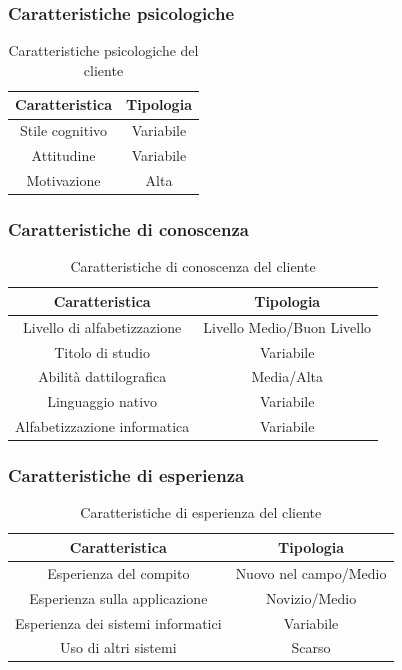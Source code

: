 \subsubsection{Caratteristiche psicologiche}
\begin{table}[h]
	\centering
	\begin{tabular}{|c|c|}
		\hline
		\textbf{Caratteristica} & \textbf{Tipologia} \\
		\hline
		Stile cognitivo & Variabile\\
		\hline
		Attitudine & Variabile \\
		\hline
		Motivazione & Alta \\
		\hline
	\end{tabular}
	\caption{Caratteristiche psicologiche del cliente}
\end{table}

\subsubsection{Caratteristiche di conoscenza}
\begin{table}[h]
	\centering
	\begin{tabular}{|c|c|}
		\hline
		\textbf{Caratteristica} & \textbf{Tipologia} \\
		\hline
		Livello di alfabetizzazione & Livello Medio/Buon Livello \\
		\hline
		Titolo di studio & Variabile \\
		\hline
		Abilità dattilografica & Media/Alta \\
		\hline
		Linguaggio nativo & Variabile \\
		\hline
		Alfabetizzazione informatica & Variabile \\
		\hline
	\end{tabular}
	\caption{Caratteristiche di conoscenza del cliente}
\end{table}

\subsubsection{Caratteristiche di esperienza}
\begin{table}[h]
	\centering
	\begin{tabular}{|c|c|}
		\hline
		\textbf{Caratteristica} & \textbf{Tipologia} \\
		\hline
		Esperienza del compito & Nuovo nel campo/Medio \\
		\hline
		Esperienza sulla applicazione & Novizio/Medio \\
		\hline
		Esperienza dei sistemi informatici & Variabile \\
		\hline
		Uso di altri sistemi & Scarso \\
		\hline
	\end{tabular}
	\caption{Caratteristiche di esperienza del cliente}
\end{table}

